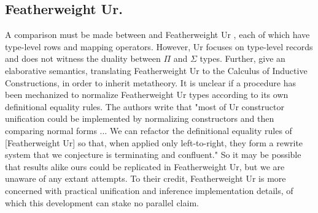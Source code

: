 \documentclass[sigplan,10pt,anonymous,review]{acmart}\settopmatter{printfolios=true,printccs=false,printacmref=false}
\begin{document}
\subsection{Featherweight Ur.} A comparison must be made between \Rome and Featherweight Ur \citep{Chlipala10}, each of which have type-level rows and mapping operators. However, Ur focuses on type-level records and does not witness the duality between $\Pi$ and $\Sigma$ types. Further, \citet{Chlipala10} give an elaborative semantics, translating Featherweight Ur to the Calculus of Inductive Constructions, in order to inherit metatheory. It is unclear if a procedure has been mechanized to normalize Featherweight Ur types according to its own definitional equality rules. The authors write that "most of Ur constructor unification could be implemented by normalizing constructors and then comparing normal forms ... We can refactor the definitional equality rules of [Featherweight Ur] so that, when applied only left-to-right, they form a rewrite system that we conjecture is terminating and confluent." So it may be possible that results alike ours could be replicated in Featherweight Ur, but we are unaware of any extant attempts. To their credit, Featherweight Ur is more concerned with practical unification and inference implementation details, of which this development can stake no parallel claim.



\end{document}
